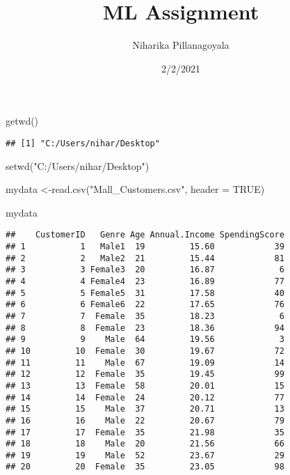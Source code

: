 \documentclass[
]{article}
\title{ML Assignment}
\author{Niharika Pillanagoyala}
\date{2/2/2021}
\newenvironment{Shaded}{\begin{snugshade}}{\end{snugshade}}
\newcommand{\AttributeTok}[1]{\textcolor[rgb]{0.77,0.63,0.00}{#1}}
\newcommand{\ConstantTok}[1]{\textcolor[rgb]{0.00,0.00,0.00}{#1}}
\newcommand{\FunctionTok}[1]{\textcolor[rgb]{0.00,0.00,0.00}{#1}}
\newcommand{\NormalTok}[1]{#1}
\newcommand{\OtherTok}[1]{\textcolor[rgb]{0.56,0.35,0.01}{#1}}
\newcommand{\StringTok}[1]{\textcolor[rgb]{0.31,0.60,0.02}{#1}}
\begin{document}
\maketitle

\begin{Shaded}
\begin{Highlighting}[]
\FunctionTok{getwd}\NormalTok{()}
\end{Highlighting}
\end{Shaded}

\begin{verbatim}
## [1] "C:/Users/nihar/Desktop"
\end{verbatim}

\begin{Shaded}
\begin{Highlighting}[]
\FunctionTok{setwd}\NormalTok{(}\StringTok{"C:/Users/nihar/Desktop"}\NormalTok{)}
\end{Highlighting}
\end{Shaded}

\begin{Shaded}
\begin{Highlighting}[]
\NormalTok{mydata }\OtherTok{\textless{}{-}}\FunctionTok{read.csv}\NormalTok{(}\StringTok{"Mall\_Customers.csv"}\NormalTok{, }\AttributeTok{header =} \ConstantTok{TRUE}\NormalTok{)}
\end{Highlighting}
\end{Shaded}

\begin{Shaded}
\begin{Highlighting}[]
\NormalTok{mydata}
\end{Highlighting}
\end{Shaded}

\begin{verbatim}
##    CustomerID   Genre Age Annual.Income SpendingScore
## 1           1   Male1  19         15.60            39
## 2           2   Male2  21         15.44            81
## 3           3 Female3  20         16.87             6
## 4           4 Female4  23         16.89            77
## 5           5 Female5  31         17.58            40
## 6           6 Female6  22         17.65            76
## 7           7  Female  35         18.23             6
## 8           8  Female  23         18.36            94
## 9           9    Male  64         19.56             3
## 10         10  Female  30         19.67            72
## 11         11    Male  67         19.09            14
## 12         12  Female  35         19.45            99
## 13         13  Female  58         20.01            15
## 14         14  Female  24         20.12            77
## 15         15    Male  37         20.71            13
## 16         16    Male  22         20.67            79
## 17         17  Female  35         21.98            35
## 18         18    Male  20         21.56            66
## 19         19    Male  52         23.67            29
## 20         20  Female  35         23.05            98
\end{verbatim}
\end{document}
